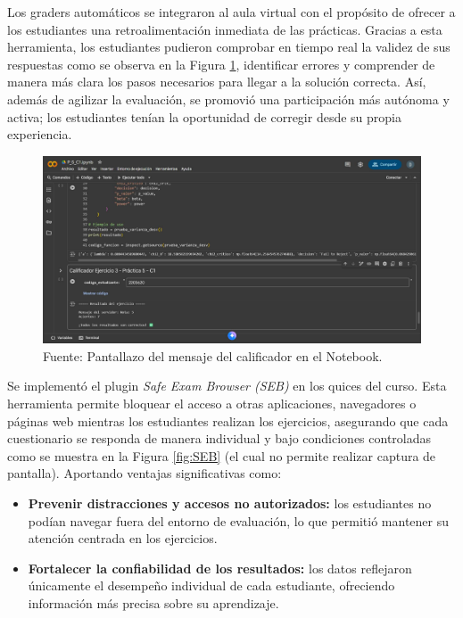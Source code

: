 \documentclass[letter,oneside,12pt,spanish]{report}
\begin{document}
Los graders automáticos se integraron al aula virtual con el propósito de ofrecer a los estudiantes una retroalimentación inmediata de las prácticas. Gracias a esta herramienta, los estudiantes pudieron comprobar en tiempo real la validez de sus respuestas como se observa en la Figura \ref{fig:Colab}, identificar errores y comprender de manera más clara los pasos necesarios para llegar a la solución correcta. Así, además de agilizar la evaluación, se promovió una participación más autónoma y activa; los estudiantes tenían la oportunidad de corregir desde su propia experiencia.

\begin{figure}[ht]
	\centering
	\includegraphics[width=1\textwidth]{Figs/Colab.pdf}
	\label{fig:Colab}
	\\Fuente: Pantallazo del mensaje del calificador en el Notebook.
\end{figure}
\newpage
Se implementó el plugin \textit{Safe Exam Browser (SEB)} en los quices del curso. Esta herramienta permite bloquear el acceso a otras aplicaciones, navegadores o páginas web mientras los estudiantes realizan los ejercicios, asegurando que cada cuestionario se responda de manera individual y bajo condiciones controladas como se muestra en la Figura \ref{fig:SEB} (el cual no permite realizar captura de pantalla). Aportando ventajas significativas como:

\begin{itemize}
    \item \textbf{Prevenir distracciones y accesos no autorizados:} los estudiantes no podían navegar fuera del entorno de evaluación, lo que permitió mantener su atención centrada en los ejercicios.
    \item \textbf{Fortalecer la confiabilidad de los resultados:} los datos reflejaron únicamente el desempeño individual de cada estudiante, ofreciendo información más precisa sobre su aprendizaje.
\end{itemize}
\end{document}

